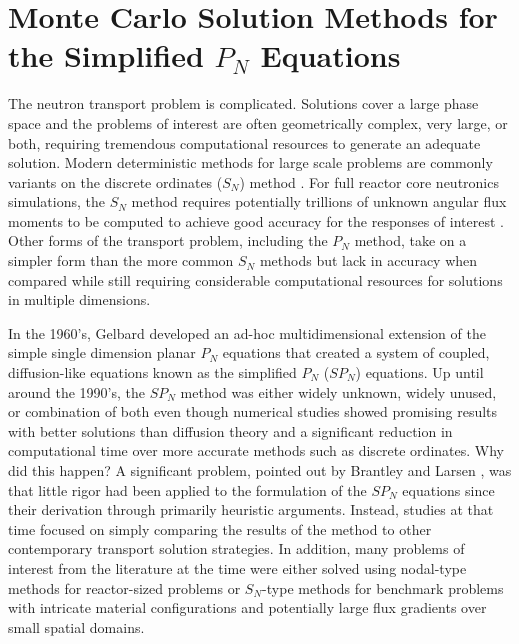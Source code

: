 \chapter{Monte Carlo Solution Methods for the Simplified $P_N$ Equations}
\label{ch:spn_equations}

The neutron transport problem is complicated. Solutions cover a large
phase space and the problems of interest are often geometrically
complex, very large, or both, requiring tremendous computational
resources to generate an adequate solution. Modern deterministic
methods for large scale problems are commonly variants on the discrete
ordinates ($S_N$) method \citep{evans_denovo:_2010}. For full reactor
core neutronics simulations, the $S_N$ method requires potentially
trillions of unknown angular flux moments to be computed to achieve
good accuracy for the responses of interest
\citep{slaybaugh_acceleration_2011}. Other forms of the transport
problem, including the $P_N$ method, take on a simpler form than the
more common $S_N$ methods but lack in accuracy when compared while
still requiring considerable computational resources for solutions in
multiple dimensions.

In the 1960's, Gelbard developed an ad-hoc multidimensional extension
of the simple single dimension planar $P_N$ equations that created a
system of coupled, diffusion-like equations known as the simplified
$P_N$ ($SP_N$) equations. Up until around the 1990's, the $SP_N$
method was either widely unknown, widely unused, or combination of
both even though numerical studies showed promising results with
better solutions than diffusion theory and a significant reduction in
computational time over more accurate methods such as discrete
ordinates. Why did this happen? A significant problem, pointed out by
Brantley and Larsen \citep{brantley_simplified_2000}, was that little
rigor had been applied to the formulation of the $SP_N$ equations
since their derivation through primarily heuristic arguments. Instead,
studies at that time focused on simply comparing the results of the
method to other contemporary transport solution strategies. In
addition, many problems of interest from the literature at the time
were either solved using nodal-type methods for reactor-sized problems
or $S_N$-type methods for benchmark problems with intricate material
configurations and potentially large flux gradients over small spatial
domains.

